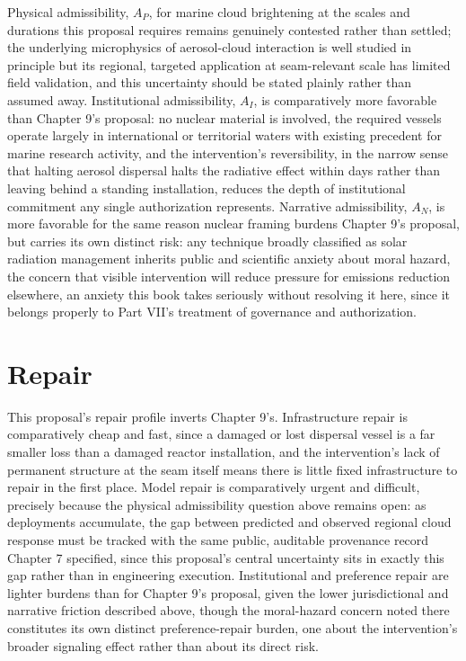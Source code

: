 \documentclass[11pt,oneside]{book}
\begin{document}
Physical admissibility, $A_P$, for marine cloud brightening at the scales and durations this proposal requires remains genuinely contested rather than settled; the underlying microphysics of aerosol-cloud interaction is well studied in principle but its regional, targeted application at seam-relevant scale has limited field validation, and this uncertainty should be stated plainly rather than assumed away. Institutional admissibility, $A_I$, is comparatively more favorable than Chapter 9's proposal: no nuclear material is involved, the required vessels operate largely in international or territorial waters with existing precedent for marine research activity, and the intervention's reversibility, in the narrow sense that halting aerosol dispersal halts the radiative effect within days rather than leaving behind a standing installation, reduces the depth of institutional commitment any single authorization represents. Narrative admissibility, $A_N$, is more favorable for the same reason nuclear framing burdens Chapter 9's proposal, but carries its own distinct risk: any technique broadly classified as solar radiation management inherits public and scientific anxiety about moral hazard, the concern that visible intervention will reduce pressure for emissions reduction elsewhere, an anxiety this book takes seriously without resolving it here, since it belongs properly to Part VII's treatment of governance and authorization.

\section*{Repair}

This proposal's repair profile inverts Chapter 9's. Infrastructure repair is comparatively cheap and fast, since a damaged or lost dispersal vessel is a far smaller loss than a damaged reactor installation, and the intervention's lack of permanent structure at the seam itself means there is little fixed infrastructure to repair in the first place. Model repair is comparatively urgent and difficult, precisely because the physical admissibility question above remains open: as deployments accumulate, the gap between predicted and observed regional cloud response must be tracked with the same public, auditable provenance record Chapter 7 specified, since this proposal's central uncertainty sits in exactly this gap rather than in engineering execution. Institutional and preference repair are lighter burdens than for Chapter 9's proposal, given the lower jurisdictional and narrative friction described above, though the moral-hazard concern noted there constitutes its own distinct preference-repair burden, one about the intervention's broader signaling effect rather than about its direct risk.
\end{document}

